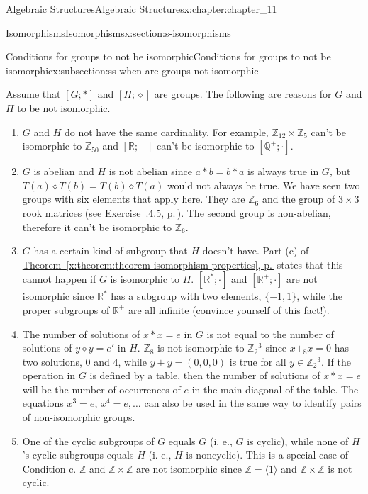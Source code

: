 \documentclass[twoside,10pt,]{book}
\newcommand{\xreffont}{\relax}
\numberwithin{equation}{section}
\begin{document}
\begin{chapterptx}{Algebraic Structures}{}{Algebraic Structures}{}{}{x:chapter:chapter_11}
\begin{sectionptx}{Isomorphisms}{}{Isomorphisms}{}{}{x:section:s-isomorphisms}
\begin{subsectionptx}{Conditions for groups to not be isomorphic}{}{Conditions for groups to not be isomorphic}{}{}{x:subsection:ss-when-are-groups-not-isomorphic}
\par
Assume that \([G;*]\) and \([H;\diamond ]\) are groups. The following are reasons for \(G\) and \(H\) to be not isomorphic.%
\begin{enumerate}[label=(\alph*)]
\item{}\(G\) and \(H\) do not have the same cardinality. For example, \(\mathbb{Z}_{12} \times  \mathbb{Z}_5\) can't be isomorphic to \(\mathbb{Z}_{50}\) and \([\mathbb{R};+]\) can't be isomorphic to \(\left[\mathbb{Q}^+ ; \cdot \right]\).%
\item{}\(G\) is abelian and \(H\) is not abelian since \(a * b = b * a\) is always true in \(G\), but \(T(a) \diamond  T(b) = T(b) \diamond T(a)\) would not always be true. We have seen  two groups with six elements that apply here.  They are \(\mathbb{Z}_6\) and the group of \(3 \times  3\) rook matrices (see \hyperlink{x:exercise:ex-rook-matrices}{Exercise~{\xreffont 11.2.4.5}, p.\,\pageref{x:exercise:ex-rook-matrices}}). The second group is non-abelian, therefore it can't be isomorphic to \(\mathbb{Z}_6\).%
\item{}\(G\) has a certain kind of subgroup that \(H\) doesn't have. Part (c) of \hyperref[x:theorem:theorem-isomorphism-properties]{Theorem~{\xreffont\ref{x:theorem:theorem-isomorphism-properties}}, p.\,\pageref{x:theorem:theorem-isomorphism-properties}} states that this cannot happen if \(G\) is isomorphic to \(H\). \(\left[\mathbb{R}^* ; \cdot \right]\) and \(\left[\mathbb{R}^+ ; \cdot \right]\) are not isomorphic since \(\mathbb{R}^*\) has a subgroup with two elements, \(\{-1, 1\}\), while the proper subgroups of \(\mathbb{R}^+\) are all infinite (convince yourself of this fact!).%
\item{}The number of solutions of \(x * x = e\) in \(G\) is not equal to the number of solutions of \(y \diamond  y = e'\) in \(H\). \(\mathbb{Z}_8\) is not isomorphic to \(\mathbb{Z}_2{}^3\) since \(x +_8 x = 0\) has two solutions, 0 and 4, while \(y + y = (0, 0, 0)\) is true for all \(y\in \mathbb{Z}_2{}^3\). If the operation in \(G\) is defined by a table, then the number of solutions of \(x * x = e\) will be the number of occurrences of \(e\) in the main diagonal of the table. The equations \(x^3 = e\), \(x^4= e, \dots\)  can also be used in the same way to identify pairs of non-isomorphic groups.%
\item{}One of the cyclic subgroups of \(G\) equals \(G\) (i. e., \(G\) is cyclic), while none of \(H\)'s cyclic subgroups equals \(H\) (i. e., \(H\) is noncyclic). This is a special case of Condition c. \(\mathbb{Z}\) and \(\mathbb{Z} \times  \mathbb{Z}\) are not isomorphic since \(\mathbb{Z} = \langle 1\rangle\) and \(\mathbb{Z} \times  \mathbb{Z}\) is not cyclic.%

\end{enumerate}
\end{subsectionptx}
\end{sectionptx}
\end{chapterptx}
\end{document}
